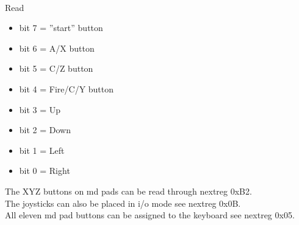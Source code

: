 \\
Read
\begin{itemize}
\item[] bit 7 = ''start'' button
\item[] bit 6 = A/X button
\item[] bit 5 = C/Z button
\item[] bit 4 = Fire/C/Y button
\item[] bit 3 = Up
\item[] bit 2 = Down
\item[] bit 1 = Left
\item[] bit 0 = Right
\end{itemize}
The XYZ buttons on md pads can be read through nextreg 0xB2.\\
The joysticks can also be placed in i/o mode see nextreg 0x0B.\\
All eleven md pad buttons can be assigned to the keyboard see nextreg 0x05.


